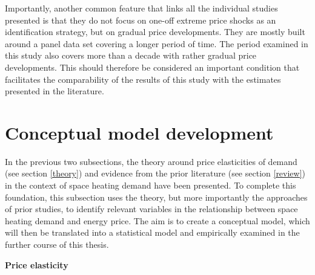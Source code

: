 \documentclass[12pt,twoside]{reedthesis}
\begin{document}
Importantly, another common feature that links all the individual studies presented is that they do not focus on one-off extreme price shocks as an identification strategy, but on gradual price developments. They are mostly built around a panel data set covering a longer period of time. The period examined in this study also covers more than a decade with rather gradual price developments. This should therefore be considered an important condition that facilitates the comparability of the results of this study with the estimates presented in the literature.

\hypertarget{conceptual-model}{%
\section{Conceptual model development}\label{conceptual-model}}

In the previous two subsections, the theory around price elasticities of demand (see section \ref{theory}) and evidence from the prior literature (see section \ref{review}) in the context of space heating demand have been presented. To complete this foundation, this subsection uses the theory, but more importantly the approaches of prior studies, to identify relevant variables in the relationship between space heating demand and energy price. The aim is to create a conceptual model, which will then be translated into a statistical model and empirically examined in the further course of this thesis.

\textbf{Price elasticity}
\end{document}
